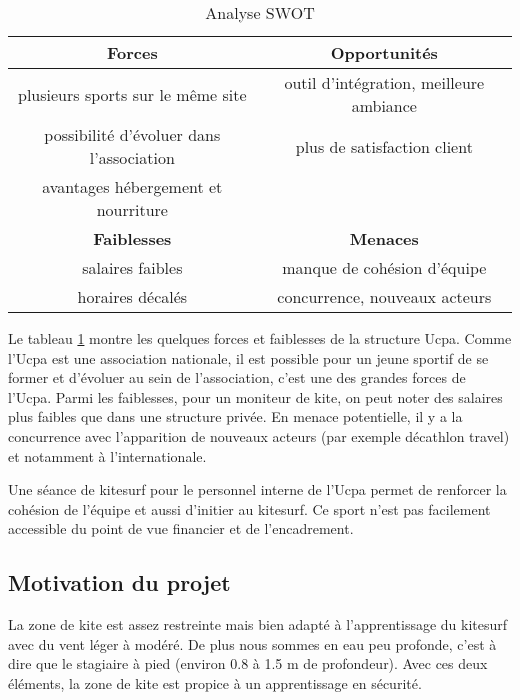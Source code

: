 \documentclass[11pt,a4paper]{report}
\begin{document}
\begin{table}
\centering
\begin{tabular}{|c|c|}
        \hline
        \textbf{Forces}                          & \textbf{Opportunités} \\ 
        \hline
        plusieurs sports sur le m\^eme site      &  outil d'intégration, meilleure ambiance\\
        possibilité d'évoluer dans l'association & plus de satisfaction client  \\
        avantages hébergement et nourriture      &                              \\
        \hline
        \textbf{Faiblesses}                      &  \textbf{Menaces} \\ 
        \hline
        salaires faibles                         & manque de cohésion d'équipe \\
        horaires décalés                         & concurrence, nouveaux acteurs   \\
        \hline
\end{tabular}
\caption{Analyse SWOT\label{swot}}
\end{table}
Le tableau \ref{swot} montre les quelques forces et faiblesses de la structure Ucpa.
Comme l'Ucpa est une association nationale, il est possible pour un jeune sportif
de se former et d'évoluer au sein de l'association, c'est une des grandes forces de l'Ucpa.
Parmi les faiblesses, pour un moniteur de kite, on peut noter des salaires plus
faibles que dans une structure privée. 
En menace potentielle, il y a  la concurrence avec 
l’apparition de nouveaux acteurs (par exemple décathlon travel) et notamment
à l'internationale.

Une séance de kitesurf pour le personnel interne de l'Ucpa 
permet de renforcer la cohésion de l'équipe et aussi d'initier au kitesurf.
Ce sport n'est pas facilement  accessible du point de vue financier et
de l'encadrement.

\subsection{Motivation du projet}
La zone de kite est assez restreinte mais bien adapté à l'apprentissage
du kitesurf avec du vent léger à modéré. De plus nous sommes en 
eau peu profonde, c'est à dire que le stagiaire à pied (environ 0.8 à 1.5 m
de profondeur). Avec ces deux éléments, la zone de kite est propice
à un apprentissage en sécurité.
\end{document}
